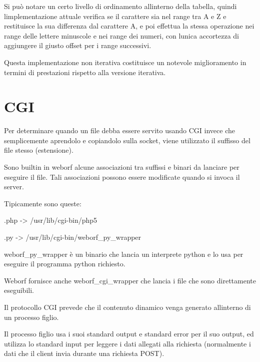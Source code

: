 \documentclass[a4paper,11pt]{article}
\begin{document}
\bigskip

{\sffamily
Si pu\`o notare un certo livello di ordinamento
all{\textquotesingle}interno della tabella, quindi
l{\textquotesingle}implementazione attuale verifica se il carattere sia
nel range tra {\textquotesingle}A{\textquotesingle} e
{\textquotesingle}Z{\textquotesingle} e restituisce la sua differenza
dal carattere {\textquotesingle}A{\textquotesingle}, e poi effettua la
stessa operazione nei range delle lettere minuscole e nei range dei
numeri, con l{\textquotesingle}unica accortezza di aggiungere il giusto
offset per i range successivi.}

{\sffamily
Questa implementazione non iterativa costituisce un notevole
miglioramento in termini di prestazioni rispetto alla versione
iterativa.}


\bigskip

\section{CGI}
{\sffamily
Per determinare quando un file debba essere servito usando CGI invece
che semplicemente aprendolo e copiandolo sulla socket, viene utilizzato
il suffisso del file stesso (estensione).}

{\sffamily
Sono builtin in weborf alcune associazioni tra suffissi e binari da
lanciare per eseguire il file. Tali associazioni possono essere
modificate quando si invoca il server.}

{\sffamily
Tipicamente sono queste:}

{\sffamily
{\textquotedbl}.php{\textquotedbl} -{\textgreater}
{\textquotedbl}/usr/lib/cgi-bin/php5{\textquotedbl}}

{\sffamily
{\textquotedbl}.py{\textquotedbl} -{\textgreater}
{\textquotedbl}/usr/lib/cgi-bin/weborf\_py\_wrapper{\textquotedbl}}


\bigskip

{\sffamily
weborf\_py\_wrapper \`e un binario che lancia un interprete python e lo
usa per eseguire il programma python richiesto.}

{\sffamily
Weborf fornisce anche weborf\_cgi\_wrapper che lancia i file che sono
direttamente eseguibili.}


\bigskip

{\sffamily
Il protocollo CGI prevede che il contenuto dinamico venga generato
all{\textquotesingle}interno di un processo figlio.}

{\sffamily
Il processo figlio usa i suoi standard output e standard error per il
suo output, ed utilizza lo standard input per leggere i dati allegati
alla richiesta (normalmente i dati che il client invia durante una
richiesta POST).}
\end{document}
